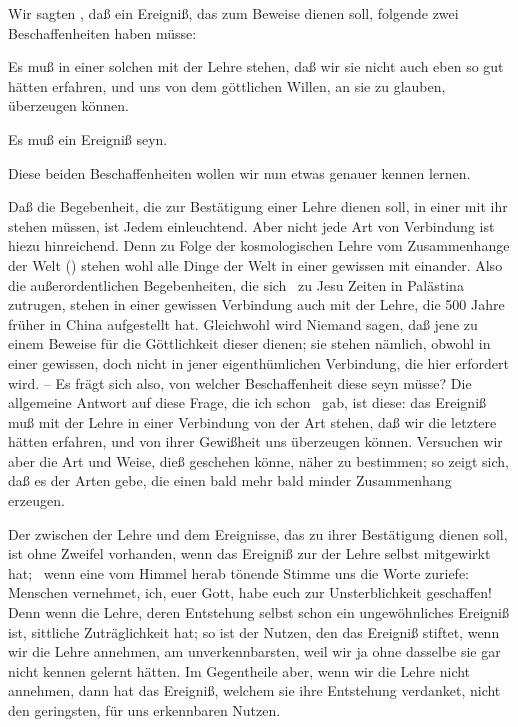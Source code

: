 Wir sagten , daß ein Ereigniß, das zum Beweise  dienen soll, folgende zwei Beschaffenheiten haben müsse:
\begin{aufzb}
\item Es muß in einer solchen  mit der Lehre stehen, daß wir sie nicht auch eben so gut  hätten erfahren, und uns von dem göttlichen Willen, an sie zu glauben, überzeugen können.
\item Es muß ein  Ereigniß seyn.
\end{aufzb}
Diese beiden Beschaffenheiten wollen wir nun etwas genauer kennen lernen.
\begin{aufza}
\item Daß die Begebenheit, die zur Bestätigung einer Lehre dienen soll, in einer  mit ihr stehen müssen, ist Jedem einleuchtend. Aber nicht jede Art von Verbindung ist hiezu hinreichend. Denn zu Folge der kosmologischen Lehre vom Zusammenhange der Welt () stehen wohl alle Dinge der Welt in einer gewissen  mit einander. Also die außerordentlichen Begebenheiten, die sich \zB\ zu Jesu Zeiten in Palästina zutrugen, stehen in einer gewissen Verbindung auch mit der Lehre, die  500 Jahre früher in China aufgestellt hat. Gleichwohl wird Niemand sagen, daß jene zu einem Beweise für die Göttlichkeit dieser dienen; sie stehen nämlich, obwohl in einer gewissen, doch nicht in jener eigenthümlichen Verbindung, die hier erfordert wird. -- Es frägt sich also, von welcher Beschaffenheit diese seyn müsse? Die allgemeine Antwort auf diese Frage, die ich schon \ gab, ist diese: das Ereigniß muß mit der Lehre in einer Verbindung von der Art stehen, daß wir die letztere  hätten erfahren, und von ihrer Gewißheit uns überzeugen können. Versuchen wir aber die Art und Weise,  dieß geschehen könne, näher zu bestimmen; so zeigt sich, daß es der Arten  gebe, die einen bald mehr bald minder  Zusammenhang erzeugen.
\begin{aufzb}
\item Der  zwischen der Lehre und dem Ereignisse, das zu ihrer Bestätigung dienen soll, ist ohne Zweifel vorhanden, wenn das Ereigniß zur  der Lehre selbst mitgewirkt hat; \zB\ wenn eine vom Himmel herab tönende Stimme uns die Worte zuriefe: Menschen vernehmet, ich, euer Gott, habe euch zur Unsterblichkeit geschaffen! Denn wenn die Lehre, deren Entstehung selbst schon ein ungewöhnliches Ereigniß ist, sittliche Zuträglichkeit hat; so ist der Nutzen, den das Ereigniß stiftet, wenn wir die Lehre annehmen, am unverkennbarsten, weil wir ja ohne dasselbe sie gar nicht kennen gelernt hätten. Im Gegentheile aber, wenn wir die Lehre nicht annehmen, dann hat das Ereigniß, welchem sie ihre Entstehung verdanket, nicht den geringsten, für uns erkennbaren Nutzen.

\end{aufzb}
\end{aufza}
